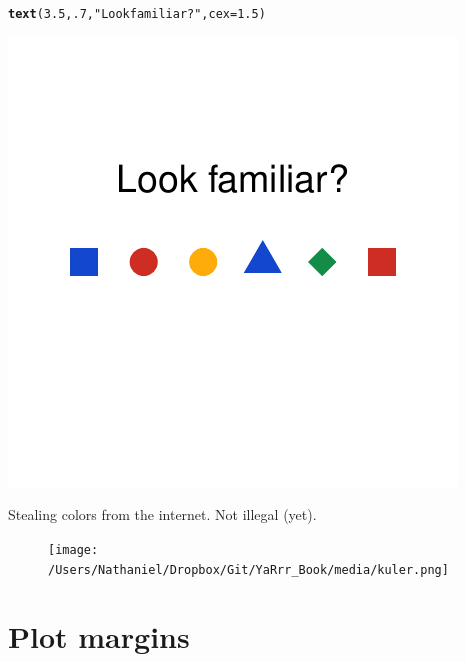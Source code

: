 \documentclass{tufte-book}\usepackage[]{graphicx}\usepackage[]{color}
\makeatletter
\def\maxwidth{ %
  \ifdim\Gin@nat@width>\linewidth
    \linewidth
  \else
    \Gin@nat@width
  \fi
}
\newcommand{\hlnum}[1]{\textcolor[rgb]{0.686,0.059,0.569}{#1}}%
\newcommand{\hlstr}[1]{\textcolor[rgb]{0.192,0.494,0.8}{#1}}%
\newcommand{\hlstd}[1]{\textcolor[rgb]{0.345,0.345,0.345}{#1}}%
\newcommand{\hlkwc}[1]{\textcolor[rgb]{0.333,0.667,0.333}{#1}}%
\newcommand{\hlkwd}[1]{\textcolor[rgb]{0.737,0.353,0.396}{\textbf{#1}}}%
\newenvironment{kframe}{%
 \def\at@end@of@kframe{}%
 \ifinner\ifhmode%
  \def\at@end@of@kframe{\end{minipage}}%
  \begin{minipage}{\columnwidth}%
 \fi\fi%
 \def\FrameCommand##1{\hskip\@totalleftmargin \hskip-\fboxsep
 \colorbox{shadecolor}{##1}\hskip-\fboxsep
     \hskip-\linewidth \hskip-\@totalleftmargin \hskip\columnwidth}%
 \MakeFramed {\advance\hsize-\width
   \@totalleftmargin\z@ \linewidth\hsize
   \@setminipage}}%
 {\par\unskip\endMakeFramed%
 \at@end@of@kframe}
\newenvironment{knitrout}{}{} %
\makeatother
\begin{document}
\begin{marginfigure}
\begin{tiny}
\begin{knitrout}
\begin{kframe}
\begin{alltt}
\hlkwd{text}\hlstd{(}\hlnum{3.5}\hlstd{,} \hlnum{.7}\hlstd{,} \hlstr{"Look familiar?"}\hlstd{,} \hlkwc{cex} \hlstd{=} \hlnum{1.5}\hlstd{)}
\end{alltt}
\end{kframe}
\includegraphics[width=\maxwidth]{figure/unnamed-chunk-232-1} 

\end{knitrout}
\end{tiny}
\label{fig:googlecolors}
\caption{Stealing colors from the internet. Not illegal (yet).}
\end{marginfigure}

\begin{figure}
\texttt{[image: /Users/Nathaniel/Dropbox/Git/YaRrr\_Book/media/kuler.png]}
\end{figure}


\pagebreak

\section{Plot margins}
\end{document}

